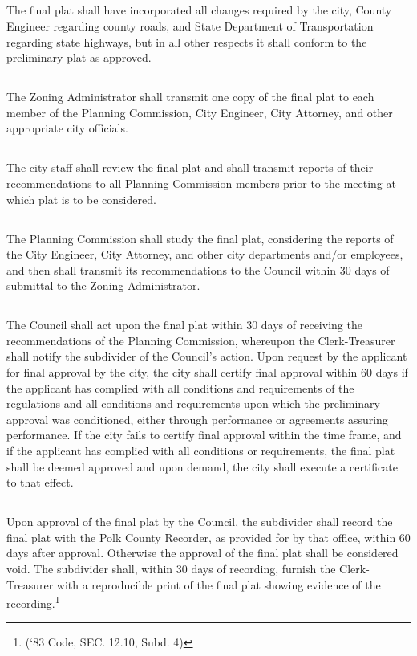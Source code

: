 \subsection{}
The final plat shall have incorporated all changes required by the city, County Engineer regarding county roads, and State Department of Transportation regarding state highways, but in all other respects it shall conform to the preliminary plat as approved.
\subsection{}
The Zoning Administrator shall transmit one copy of the final plat to each member of the Planning Commission, City Engineer, City Attorney, and other appropriate city officials.
\subsection{}
The city staff shall review the final plat and shall transmit reports of their recommendations to all Planning Commission members prior to the meeting at which plat is to be considered.
\subsection{}
The Planning Commission shall study the final plat, considering the reports of the City Engineer, City Attorney, and other city departments and/or employees, and then shall transmit its recommendations to the Council within 30 days of submittal to the Zoning Administrator.
\subsection{}
The Council shall act upon the final plat within 30 days of receiving the recommendations of the Planning Commission, whereupon the Clerk-Treasurer shall notify the subdivider of the Council’s action. Upon request by the applicant for final approval by the city, the city shall certify final approval within 60 days if the applicant has complied with all conditions and requirements of the regulations and all conditions and requirements upon which the preliminary approval was conditioned, either through performance or agreements assuring performance. If the city fails to certify final approval within the time frame, and if the applicant has complied with all conditions or requirements, the final plat shall be deemed approved and upon demand, the city shall execute a certificate to that effect.
\subsection{}
Upon approval of the final plat by the Council, the subdivider shall record the final plat with the Polk County Recorder, as provided for by that office, within 60 days after approval.  Otherwise the approval of the final plat shall be considered void. The subdivider shall, within 30 days of recording, furnish the Clerk-Treasurer with a reproducible print of the final plat showing evidence of the recording.\footnote{(‘83 Code, SEC. 12.10, Subd. 4)}

